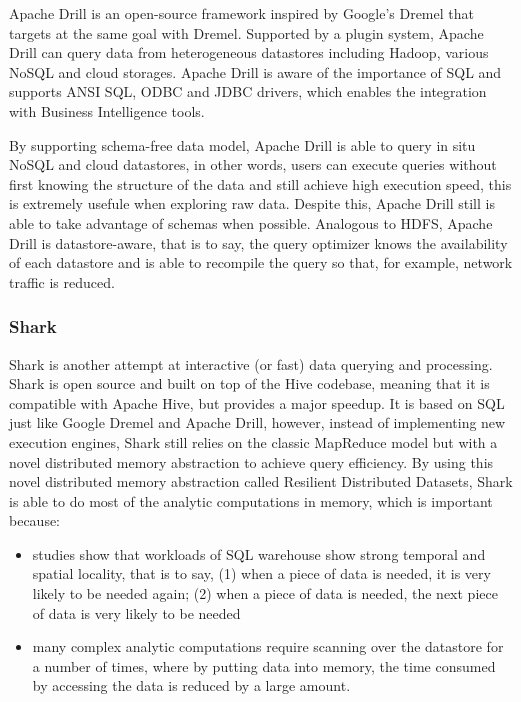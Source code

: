 \documentclass{article}
\begin{document}
Apache Drill is an open-source framework inspired by Google's Dremel that targets at the same goal with Dremel. Supported by a plugin system, Apache Drill can query data from heterogeneous datastores including Hadoop, various NoSQL and cloud storages. Apache Drill is aware of the importance of SQL and supports ANSI SQL, ODBC and JDBC drivers, which enables the integration with Business Intelligence tools.

By supporting schema-free data model, Apache Drill is able to query in situ NoSQL and cloud datastores, in other words, users can execute queries without first knowing the structure of the data and still achieve high execution speed, this is extremely usefule when exploring raw data.\cite{intro-to-drill} Despite this, Apache Drill still is able to take advantage of schemas when possible.\cite{faq-drill} Analogous to HDFS, Apache Drill is datastore-aware, that is to say, the query optimizer knows the availability of each datastore and is able to recompile the query so that, for example, network traffic is reduced.\cite{wiki:drill}

\subsubsection{Shark}

Shark is another attempt at interactive (or fast) data querying and processing. Shark is open source and built on top of the Hive codebase, meaning that it is compatible with Apache Hive, but provides a major speedup. It is based on SQL just like Google Dremel and Apache Drill, however, instead of implementing new execution engines, Shark still relies on the classic MapReduce model but with a novel distributed memory abstraction to achieve query efficiency. By using this novel distributed memory abstraction called Resilient Distributed Datasets, Shark is able to do most of the analytic computations in memory, which is important because:

\begin{itemize}
\item studies show that workloads of SQL warehouse show strong temporal and spatial locality, that is to say, (1) when a piece of data is needed, it is very likely to be needed again; (2) when a piece of data is needed, the next piece of data is very likely to be needed
\item many complex analytic computations require scanning over the datastore for a number of times, where by putting data into memory, the time consumed by accessing the data is reduced by a large amount.\cite{xin2013shark}
\end{itemize}
\end{document}
